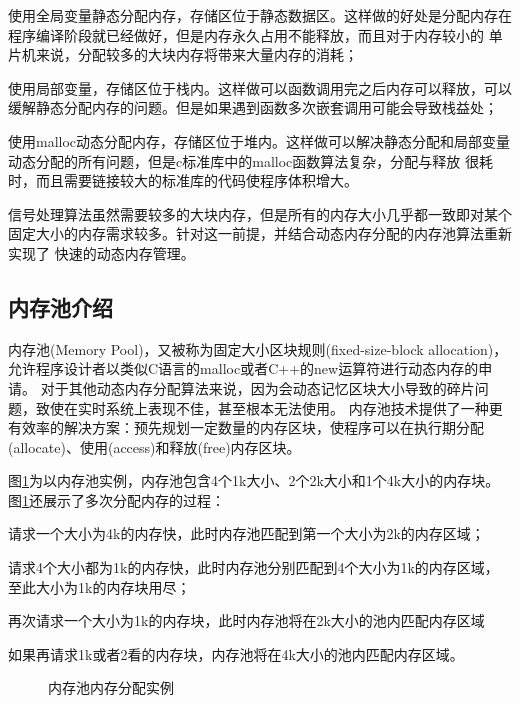 \begin{publist}
	\item 使用全局变量静态分配内存，存储区位于静态数据区。这样做的好处是分配内存在程序编译阶段就已经做好，但是内存永久占用不能释放，而且对于内存较小的
	单片机来说，分配较多的大块内存将带来大量内存的消耗；
	\item 使用局部变量，存储区位于栈内。这样做可以函数调用完之后内存可以释放，可以缓解静态分配内存的问题。但是如果遇到函数多次嵌套调用可能会导致栈益处；
	\item 使用malloc动态分配内存，存储区位于堆内。这样做可以解决静态分配和局部变量动态分配的所有问题，但是c标准库中的malloc函数算法复杂，分配与释放
	很耗时，而且需要链接较大的标准库的代码使程序体积增大。
\end{publist}

	信号处理算法虽然需要较多的大块内存，但是所有的内存大小几乎都一致即对某个固定大小的内存需求较多。针对这一前提，并结合动态内存分配的内存池算法重新实现了
快速的动态内存管理。


\subsection{内存池介绍}
	内存池(Memory Pool)，又被称为固定大小区块规则(fixed-size-block allocation)，允许程序设计者以类似C语言的malloc或者C++的new运算符进行动态内存的申请。
对于其他动态内存分配算法来说，因为会动态记忆区块大小导致的碎片问题，致使在实时系统上表现不佳，甚至根本无法使用。
内存池技术提供了一种更有效率的解决方案：预先规划一定数量的内存区块，使程序可以在执行期分配(allocate)、使用(access)和释放(free)内存区块。
	
	图\ref{Figure:Software:memalloc}为以内存池实例，内存池包含4个1k大小、2个2k大小和1个4k大小的内存块。图\ref{Figure:Software:memalloc}还展示了多次分配内存的过程：
	
\begin{publist}
	\item 请求一个大小为4k的内存快，此时内存池匹配到第一个大小为2k的内存区域；
	\item 请求4个大小都为1k的内存快，此时内存池分别匹配到4个大小为1k的内存区域，至此大小为1k的内存块用尽；
	\item 再次请求一个大小为1k的内存块，此时内存池将在2k大小的池内匹配内存区域
	\item 如果再请求1k或者2看的内存块，内存池将在4k大小的池内匹配内存区域。
\end{publist}

	\begin{figure}[htbp]
		\centering
		
		\caption{内存池内存分配实例}
		\label{Figure:Software:memalloc}
	\end{figure}

